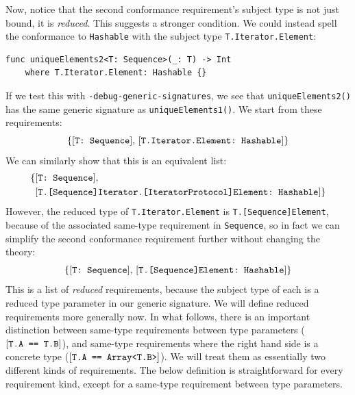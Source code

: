\documentclass[../generics]{subfiles}
\begin{document}
Now, notice that the second conformance requirement's subject type is not just bound, it is \emph{reduced}. This suggests a stronger condition. We could instead spell the conformance to \texttt{Hashable} with the subject type \texttt{T.Iterator.Element}:
\begin{Verbatim}
func uniqueElements2<T: Sequence>(_: T) -> Int
    where T.Iterator.Element: Hashable {}
\end{Verbatim}
If we test this with \texttt{-debug-generic-signatures}, we see that \texttt{uniqueElements2()} has the same generic signature as \texttt{uniqueElements1()}. We start from these requirements:
\[\{[\texttt{T:~Sequence}],\,[\texttt{T.Iterator.Element:~Hashable}]\}\]
We can similarly show that this is an equivalent list:
\begin{align*}
\{&[\texttt{T:~Sequence}],\,\\
&[\texttt{T.[Sequence]Iterator.[IteratorProtocol]Element:~Hashable}]\}
\end{align*}
However, the reduced type of \texttt{T.Iterator.Element} is \texttt{T.[Sequence]Element}, because of the associated same-type requirement in \texttt{Sequence}, so in fact we can simplify the second conformance requirement further without changing the theory:
\[\{[\texttt{T:~Sequence}],\,[\texttt{T.[Sequence]Element:~Hashable}]\}\]
This is a list of \emph{reduced} requirements, because the subject type of each is a reduced type parameter in our generic signature. We will define reduced requirements more generally now. In what follows, there is an important distinction between same-type requirements between type parameters ($[\texttt{T.A == T.B}]$), and same-type requirements where the right hand side is a concrete type ($[\texttt{T.A == Array<T.B>}]$). We will treat them as essentially two different kinds of requirements. The below definition is straightforward for every requirement kind, except for a same-type requirement between type parameters.
\end{document}
